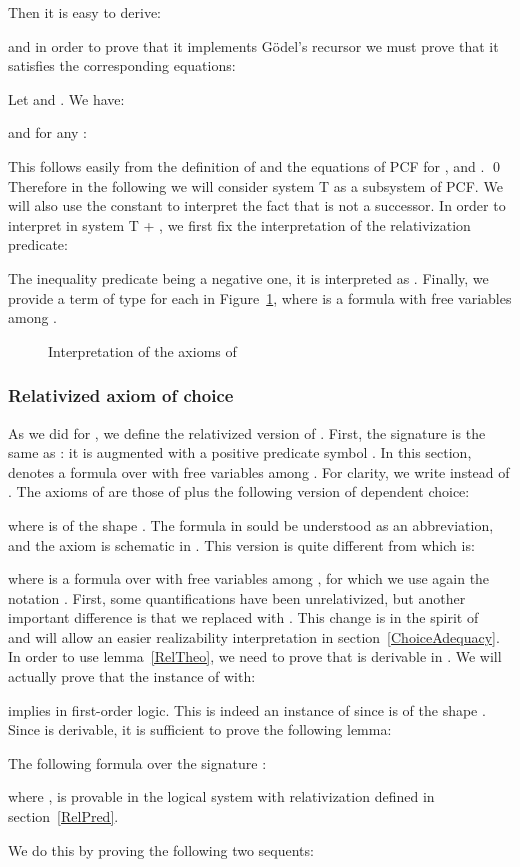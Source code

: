 \documentclass{CSML}
\begin{document}
Then it is easy to derive:

and in order to prove that it implements G\"odel's recursor we must prove that it satisfies the corresponding equations:
\begin{lem}
Let  and . We have:

and for any :

\end{lem}
\proof
This follows easily from the definition of  and the equations of PCF for ,  and .
\qed
Therefore in the following we will consider system T as a subsystem of PCF. We will also use the constant  to interpret the fact that  is not a successor. In order to interpret  in system T + , we first fix the interpretation of the relativization predicate:

The inequality predicate being a negative one, it is interpreted as . Finally, we provide a term  of type  for each  in Figure~\ref{AxiomTrans}, where  is a formula with free variables among .
\begin{figure}



\caption{Interpretation of the axioms of }
\label{AxiomTrans}
\end{figure}
\subsubsection{Relativized axiom of choice}
\label{RelCAom}
As we did for , we define the relativized version  of . First, the signature is the same as : it is  augmented with a positive predicate symbol . In this section,  denotes a formula over  with free variables among . For clarity, we write  instead of . The axioms of  are those of  plus the following version of dependent choice:

where  is of the shape . The formula  in  sould be understood as an abbreviation, and the axiom is schematic in . This version is quite different from  which is:

where  is a formula over  with free variables among , for which we use again the notation . First, some quantifications have been unrelativized, but another important difference is that we replaced  with . This change is in the spirit of~\cite{EscardoOlivaPeirce} and will allow an easier realizability interpretation in section~\ref{ChoiceAdequacy}. In order to use lemma~\ref{RelTheo}, we need to prove that  is derivable in . We will actually prove that the instance of  with:

implies  in first-order logic. This is indeed an instance of  since  is of the shape . Since  is derivable, it is sufficient to prove the following lemma:
\begin{lem}
The following formula over the signature :

where , is provable in the logical system with relativization defined in section~\ref{RelPred}.
\end{lem}
\proof
We do this by proving the following two sequents:
\end{document}
